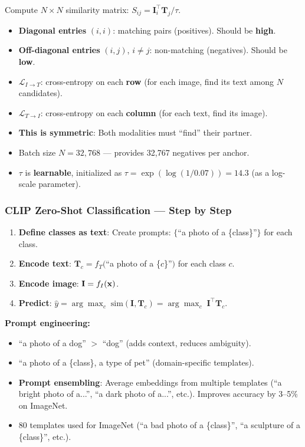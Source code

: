 \begin{keybox}
Compute $N \times N$ similarity matrix: $S_{ij} = \mathbf{I}_i^\top \mathbf{T}_j / \tau$.
\begin{itemize}
\item \textbf{Diagonal entries} $(i,i)$: matching pairs (positives). Should be \textbf{high}.
\item \textbf{Off-diagonal entries} $(i,j)$, $i \neq j$: non-matching (negatives). Should be \textbf{low}.
\item $\mathcal{L}_{I \to T}$: cross-entropy on each \textbf{row} (for each image, find its text among $N$ candidates).
\item $\mathcal{L}_{T \to I}$: cross-entropy on each \textbf{column} (for each text, find its image).
\item \textbf{This is symmetric}: Both modalities must ``find'' their partner.
\item Batch size $N = 32{,}768$ — provides 32,767 negatives per anchor.
\item $\tau$ is \textbf{learnable}, initialized as $\tau = \exp(\log(1/0.07)) = 14.3$ (as a log-scale parameter).
\end{itemize}
\end{keybox}

\subsubsection{CLIP Zero-Shot Classification — Step by Step}
\begin{enumerate}
\item \textbf{Define classes as text}: Create prompts: $\{$``a photo of a \{class\}''$\}$ for each class.
\item \textbf{Encode text}: $\mathbf{T}_c = f_T($``a photo of a \{$c$\}''$)$ for each class $c$.
\item \textbf{Encode image}: $\mathbf{I} = f_I(\mathbf{x})$.
\item \textbf{Predict}: $\hat{y} = \arg\max_c \; \text{sim}(\mathbf{I}, \mathbf{T}_c) = \arg\max_c \; \mathbf{I}^\top \mathbf{T}_c$.
\end{enumerate}

\textbf{Prompt engineering:}
\begin{itemize}
\item ``a photo of a dog'' $>$ ``dog'' (adds context, reduces ambiguity).
\item ``a photo of a \{class\}, a type of pet'' (domain-specific templates).
\item \textbf{Prompt ensembling}: Average embeddings from multiple templates (``a bright photo of a...'', ``a dark photo of a...'', etc.). Improves accuracy by 3--5\% on ImageNet.
\item 80 templates used for ImageNet (``a bad photo of a \{class\}'', ``a sculpture of a \{class\}'', etc.).
\end{itemize}

